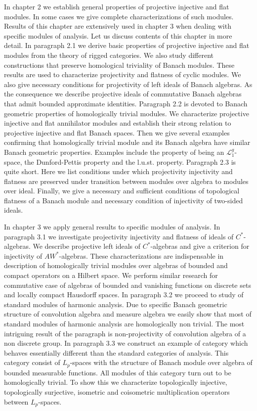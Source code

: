 \documentclass[11pt, a4paper, oneside]{Thesis} %
\begin{document}
In chapter 2 we establish general properties of projective injective and flat modules. In some cases we give complete characterizations of such modules. Results of this chapter are extensively used in chapter 3 when dealing with specific modules of analysis. Let us discuss contents of this chapter in more detail. In paragraph 2.1 we derive basic properties of projective injective and flat modules from the theory of rigged categories. We also study different constructions that preserve homological triviality of Banach modules. These results are used to characterize projectivity and flatness of cyclic modules. We also give necessary conditions for projectivity of left ideals of Banach algebras. As the consequence we describe projective ideals of commutative Banach algebras that admit bounded approximate identities. Paragraph 2.2 is devoted to Banach geometric properties of homologically trivial modules. We characterize projective injective and flat annihilator modules and establish their strong relation to projective injective and flat Banach spaces. Then we give several examples confirming that homologically trivial module and its Banach algebra have similar Banach geometric properties. Examples include the property of being an $\mathscr{L}_1^g$-space, the Dunford-Pettis property and the l.u.st. property. Paragraph 2.3 is quite short. Here we list conditions under which projectivity injectivity and flatness are preserved under transition between modules over algebra to modules over ideal. Finally, we give a necessary and sufficient conditions of topological flatness of a Banach module and necessary condition of injectivity of two-sided ideals.

In chapter 3 we apply general results to specific modules of analysis. In paragraph 3.1 we investigate projectivity injectivity and flatness of ideals of $C^*$-algebras. We describe projective left ideals of $C^*$-algebras and give a criterion for injectivity of $AW^*$-algebras. These characterizations are indispensable in description of homologically trivial modules over algebras of bounded and compact operators on a Hilbert space. We perform similar research for commutative case of algebras of bounded and vanishing functions on discrete sets and locally compact Hausdorff spaces. In paragraph 3.2 we proceed to study of standard modules of harmonic analysis. Due to specific Banach geometric structure of convolution algebra and measure algebra we easily show that most of standard modules of harmonic analysis are homologically non trivial. The most intriguing result of the paragraph is non-projectivity of convolution algebra of a non discrete group. In paragraph 3.3 we construct an example of category which behaves essentially different than the standard categories of analysis. This category consist of $L_p$-spaces with the structure of Banach module over algebra of bounded measurable functions. All modules of this category turn out to be homologically trivial. To show this we characterize topologically injective, topologically surjective, isometric and coisometric multiplication operators between $L_p$-spaces.
\end{document}
